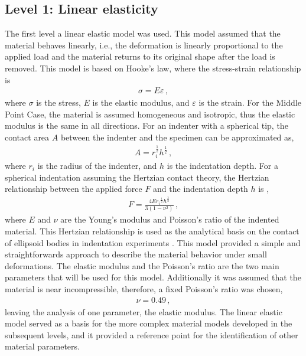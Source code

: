\subsection{Level 1: Linear elasticity}
The first level a linear elastic model was used. This model assumed that the material behaves linearly, 
i.e., the deformation is linearly proportional to the applied load and the material returns to its original 
shape after the load is removed. This model is based on Hooke's law, where the stress-strain relationship is 
\begin{align*}
    \sigma = E\varepsilon \, ,
\end{align*}
where $\sigma$ is the stress, $E$ is the elastic modulus, and $\varepsilon$ is the strain. 
For the Middle Point Case, the material is assumed homogeneous and isotropic, thus the elastic modulus is the 
same in all directions. 
For an indenter with a spherical tip, the contact area $A$ between the indenter and the specimen can be approximated as, 
\begin{align*}
    A = r_i^{\frac{1}{2}} h^{\frac{1}{2}} \, ,
\end{align*}
where $r_i$ is the radius of the indenter, and $h$ is the indentation depth.
For a spherical indentation assuming the Hertzian contact theory, the Hertzian relationship 
between the applied force $F$ and the indentation depth $h$ is \cite{Lin2009}, 
\begin{align}
    F = \frac{4E{r_i}^{\frac{1}{2}} {h}^{\frac{3}{2}}}{3(1-\nu^2)} \, ,
\end{align}
where $E$ and $\nu$ are the Young's modulus and Poisson's ratio of the indented material.
This Hertzian relationship is used as the analytical basis on the contact of ellipsoid bodies in 
indentation experiments \cite{Lin2009}.
This model provided a simple and straightforwards approach to describe the material behavior under 
small deformations. The elastic modulus and the Poisson's ratio are the two main parameters 
that will be used for this model. Additionally it was assumed that the material is near incompressible,
therefore, a fixed Poisson's ratio was chosen, 
\begin{align}
    \nu = 0.49 \, ,
\end{align}
leaving the analysis of one parameter, the elastic modulus. The linear elastic model served as a basis for the more 
complex material models developed in the subsequent levels, and it provided a reference point for 
the identification of other material parameters.


